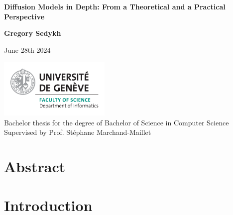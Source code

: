 \documentclass{article}
\begin{document}
\begin{titlepage}
  \begin{center}
      \vspace*{1cm}

      \LARGE
      \textbf{Diffusion Models in Depth: From a Theoretical and a Practical Perspective}

      \vspace{1.5cm}

      \Large
      \textbf{Gregory Sedykh}
      \vspace{0.8cm}

      \normalsize
      June 28th 2024

      \vfill

      \includegraphics[width=0.4\textwidth]{images/informatics_en.png} \\

      Bachelor thesis for the degree of Bachelor of Science in Computer Science \\
      Supervised by Prof. Stéphane Marchand-Maillet     

      \vspace{0.8cm}
    
           
           
  \end{center}
\end{titlepage}

\newpage
\section*{Abstract}

\newpage
\tableofcontents



\newpage
\section{Introduction}
\end{document}

